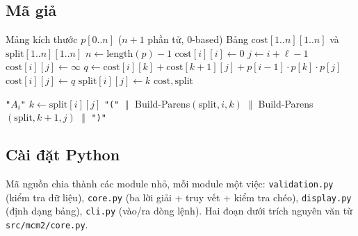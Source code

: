 \documentclass[12pt,a4paper]{article}
\begin{document}
\subsection{Mã giả}

\begin{algorithm}[H]
\caption{Bottom-Up-MCM$(p)$}
\begin{algorithmic}[1]
\Require Mảng kích thước $p[0..n]$ ($n+1$ phần tử, 0-based)
\Ensure Bảng $\mathrm{cost}[1..n][1..n]$ và $\mathrm{split}[1..n][1..n]$
\State $n \leftarrow \text{length}(p) - 1$
    \State $\mathrm{cost}[i][i] \leftarrow 0$
\EndFor
{} 
        \State $j \leftarrow i + \ell - 1$
        \State $\mathrm{cost}[i][j] \leftarrow \infty$
            \State $q \leftarrow \mathrm{cost}[i][k] + \mathrm{cost}[k+1][j] + p[i{-}1] \cdot p[k] \cdot p[j]$
                \State $\mathrm{cost}[i][j] \leftarrow q$
                \State $\mathrm{split}[i][j] \leftarrow k$
            \EndIf
        \EndFor
    \EndFor
\EndFor
\State \Return $\mathrm{cost}, \mathrm{split}$
\end{algorithmic}
\end{algorithm}

\begin{algorithm}[H]
\caption{Build-Parens$(\mathrm{split}, i, j)$}
\begin{algorithmic}[1]
    \State \Return \texttt{"$A_i$"}
\Else
    \State $k \leftarrow \mathrm{split}[i][j]$
    \State \Return \texttt{"("} $\;\Vert\;$ Build-Parens$(\mathrm{split}, i, k)$ $\;\Vert\;$ Build-Parens$(\mathrm{split}, k+1, j)$ $\;\Vert\;$ \texttt{")"}
\EndIf
\end{algorithmic}
\end{algorithm}

\subsection{Cài đặt Python}
Mã nguồn chia thành các module nhỏ, mỗi module một việc: \texttt{validation.py} (kiểm tra dữ liệu), \texttt{core.py} (ba lời giải + truy vết + kiểm tra chéo), \texttt{display.py} (định dạng bảng), \texttt{cli.py} (vào/ra dòng lệnh). Hai đoạn dưới trích nguyên văn từ \texttt{src/mcm2/core.py}.
\end{document}
